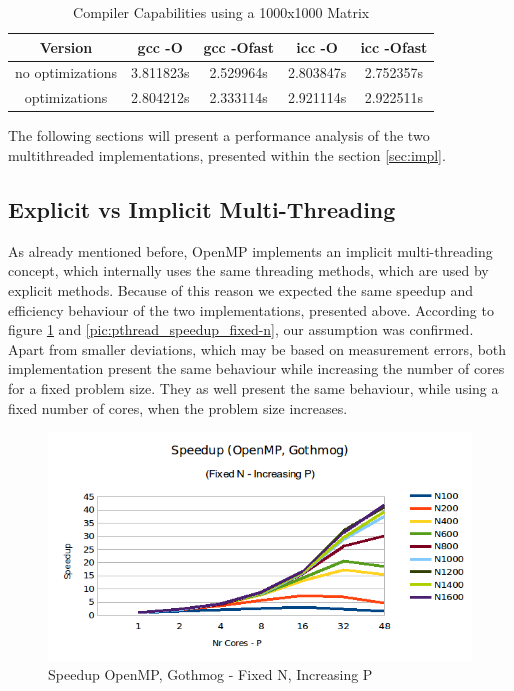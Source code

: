 \documentclass[conference]{IEEEtran}
\begin{document}
\begin{table}[!t]
\renewcommand{\arraystretch}{1.3}
\caption{Compiler Capabilities using a 1000x1000 Matrix}
\label{table:compiler}
\centering
\begin{tabular}{|c||c|c|c|c|}
\hline
Version & gcc -O & gcc -Ofast & icc -O & icc -Ofast \\
\hline
no optimizations & 3.811823s & 2.529964s & 2.803847s & 2.752357s \\
\hline
optimizations & 2.804212s & 2.333114s & 2.921114s & 2.922511s \\
\hline
\end{tabular}
\end{table}



The following sections will present a performance analysis of the two multithreaded implementations, presented within the section \ref{sec:impl}. 

\subsection{Explicit vs Implicit Multi-Threading}
\label{sec:analysis:pthread}

As already mentioned before, OpenMP implements an implicit multi-threading concept, which internally uses the same threading methods, which are used by explicit methods. Because of this reason we expected the same speedup and efficiency behaviour of the two implementations, presented above. According to figure \ref{pic:omp_speedup_fixed-n} and \ref{pic:pthread_speedup_fixed-n}, our assumption was confirmed. Apart from smaller deviations, which may be based on measurement errors, both implementation present the same behaviour while increasing the number of cores for a fixed problem size. They as well present the same behaviour, while using a fixed number of cores, when the problem size increases. 

\begin{figure}[h]
  \centering
  \includegraphics[scale=0.42]{pic/omp_gothmog_speedup-fixed-n.png} 
  \caption{Speedup OpenMP, Gothmog - Fixed N, Increasing P}
  \label{pic:omp_speedup_fixed-n}
\end{figure}
\end{document}
